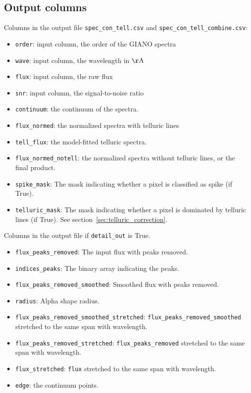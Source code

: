 \documentclass{article}
\begin{document}
\subsection{Output columns}

Columns in the output file \texttt{spec\_con\_tell.csv} and \texttt{spec\_con\_tell\_combine.csv}:
\begin{itemize}
    \item \texttt{order}: input column, the order of the GIANO spectra
    \item \texttt{wave}: input column, the wavelength in $\mathrm{\AA}$
    \item \texttt{flux}: input column, the raw flux
    \item \texttt{snr}: input column, the signal-to-noise ratio
    \item \texttt{continuum}: the continuum of the spectra.
    \item \texttt{flux\_normed}: the normalized spectra with telluric lines
    \item \texttt{tell\_flux}: the model-fitted telluric spectra.
    \item \texttt{flux\_normed\_notell}: the normalized spectra without telluric lines, or the final product.
    \item \texttt{spike\_mask}: The mask indicating whether a pixel is classified as spike (if True).
    \item \texttt{telluric\_mask}: The mask indicating whether a pixel is dominated by telluric lines (if True). See section~\ref{sec:telluric_correction}.
\end{itemize}

Columns in the output file if \texttt{detail\_out} is True.

\begin{itemize}
    \item \texttt{flux\_peaks\_removed}: The input flux with peaks removed.
    \item \texttt{indices\_peaks}: The binary array indicating the peaks.
    \item \texttt{flux\_peaks\_removed\_smoothed}: Smoothed flux with peaks removed.
    \item \texttt{radius}: Alpha shape radius.
    \item \texttt{flux\_peaks\_removed\_smoothed\_stretched}: \texttt{flux\_peaks\_removed\_smoothed} stretched to the same span with wavelength. 
    \item \texttt{flux\_peaks\_removed\_stretched}: \texttt{flux\_peaks\_removed} stretched to the same span with wavelength. 
    \item \texttt{flux\_stretched}: \texttt{flux} stretched to the same span with wavelength. 
    \item \texttt{edge}: the continuum points.
\end{itemize}
\end{document}
